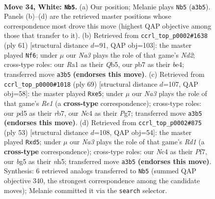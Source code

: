 \documentclass[11pt]{article}
\begin{document}
\clearpage

\begin{figure}[p]\centering
\begin{subfigure}{0.46\textwidth}\centering
\resizebox{\linewidth}{!}{%
\newchessgame
\chessboard[
  setfen={r2r4/1pp3kp/5p2/3p1bb1/1qNK4/N3P3/P4P2/R7 w - - 2 34},
  showmover=false,
  pgfstyle=straightmove, color=movearrow, markmove={a3-b5}
]}
\caption{}
\end{subfigure}\hfill
\begin{subfigure}{0.46\textwidth}\centering
\resizebox{\linewidth}{!}{%
\newchessgame
\chessboard[
  setfen={4Qnk1/1p1n2p1/2p5/1q6/3pB3/6P1/1P3PKP/r1B1R3 b - - 10 31},
  showmover=false,
  pgfstyle=straightmove, color=movearrow, markmove={d7-f6}
]}
\caption{}
\end{subfigure}
\\[4pt]
\begin{subfigure}{0.46\textwidth}\centering
\resizebox{\linewidth}{!}{%
\newchessgame
\chessboard[
  setfen={4r2k/1R4p1/2p3p1/3nQ1B1/8/2n2BP1/5P1P/6K1 b - - 0 35},
  showmover=false,
  pgfstyle=straightmove, color=movearrow, markmove={e8-e5}
]}
\caption{}
\end{subfigure}\hfill
\begin{subfigure}{0.46\textwidth}\centering
\resizebox{\linewidth}{!}{%
\newchessgame
\chessboard[
  setfen={3r2k1/1p3pp1/7p/3Q1n1N/3n4/5P1P/1P4P1/2BR3K b - - 0 27},
  showmover=false,
  pgfstyle=straightmove, color=movearrow, markmove={d8-d5}
]}
\caption{}
\end{subfigure}
\caption{\textbf{Move 34, White: \texttt{Nb5}.} (a) Our position; Melanie plays \texttt{Nb5} (\texttt{a3b5}). Panels (b)--(d) are the retrieved master positions whose correspondence most drove this move (highest QAP objective among those that transfer to it). (b) Retrieved from \texttt{ccrl\_top\_p0002\#1638} (ply 61) [structural distance $d$=91, QAP obj=103]: the master played \texttt{Nf6}; under $\mu$ our \emph{Na3} plays the role of that game's \emph{Nd2}; cross-type roles: our \emph{R}a1 as their \emph{Q}b5, our \emph{p}b7 as their \emph{b}e4; transferred move \texttt{a3b5} \textbf{(endorses this move)}. (c) Retrieved from \texttt{ccrl\_top\_p0000\#1018} (ply 69) [structural distance $d$=107, QAP obj=58]: the master played \texttt{Rxe5}; under $\mu$ our \emph{Na3} plays the role of that game's \emph{Re1} (a \textbf{cross-type} correspondence); cross-type roles: our \emph{p}d5 as their \emph{r}b7, our \emph{N}c4 as their \emph{P}g7; transferred move \texttt{a3b5} \textbf{(endorses this move)}. (d) Retrieved from \texttt{ccrl\_top\_p0002\#875} (ply 53) [structural distance $d$=108, QAP obj=54]: the master played \texttt{Rxd5}; under $\mu$ our \emph{Na3} plays the role of that game's \emph{Rd1} (a \textbf{cross-type} correspondence); cross-type roles: our \emph{N}c4 as their \emph{P}f7, our \emph{b}g5 as their \emph{n}h5; transferred move \texttt{a3b5} \textbf{(endorses this move)}. Synthesis: 6 retrieved analogs transferred to \texttt{Nb5} (summed QAP objective 340, the strongest correspondence among the candidate moves); Melanie committed it via the \texttt{search} selector.}
\label{fig:thought-m66}
\end{figure}
\end{document}
